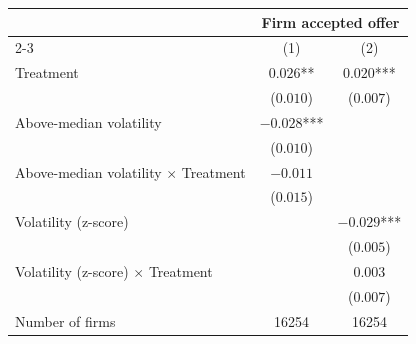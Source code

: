 \begin{tabular}[t]{lcc}
\toprule
  & \multicolumn{2}{c}{Firm accepted offer} \\
  \cmidrule(lr){2-3}
  & (1) & (2) \\
\midrule
Treatment & $0.026$** & $0.020$***\\
 & ($0.010$) & ($0.007$)\\
Above-median volatility & $-0.028$*** & \\
 & ($0.010$) & \\
Above-median volatility $\times$ Treatment & $-0.011$ & \\
 & ($0.015$) & \\
Volatility (z-score) &  & $-0.029$***\\
 &  & ($0.005$)\\
Volatility (z-score) $\times$ Treatment &  & $0.003$\\
 &  & ($0.007$)\\
\midrule
Number of firms & 16254 & 16254\\
\bottomrule
\end{tabular}
